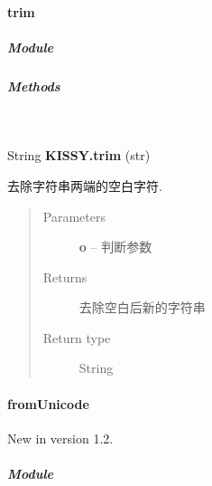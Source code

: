 \documentclass[letterpaper,10pt,english]{sphinxmanual}
\begin{document}
\paragraph{trim}
\label{api/seed/lang/trim:trim}\label{api/seed/lang/trim::doc}

\subparagraph{Module}
\label{api/seed/lang/trim:module}\begin{quote}

{\hyperref[api/seed/lang/index:module-Lang]{}}
\end{quote}


\subparagraph{Methods}
\label{api/seed/lang/trim:methods}

\begin{fulllineitems}
\label{api/seed/lang/trim:Lang.KISSY.trim}~
\begin{DUlineblock}{0em}
\item[] String \textbf{KISSY.trim} (str)
\item[] 去除字符串两端的空白字符.
\end{DUlineblock}
\begin{quote}\begin{description}
\item[{Parameters}] \leavevmode
\textbf{o} -- 判断参数

\item[{Returns}] \leavevmode
去除空白后新的字符串

\item[{Return type}] \leavevmode
String

\end{description}\end{quote}

\end{fulllineitems}



\paragraph{fromUnicode}
\label{api/seed/lang/fromUnicode:fromunicode}\label{api/seed/lang/fromUnicode::doc}New in version 1.2.

\subparagraph{Module}
\label{api/seed/lang/fromUnicode:module}\begin{quote}

{\hyperref[api/seed/lang/index:module-Lang]{}}
\end{quote}
\end{document}
